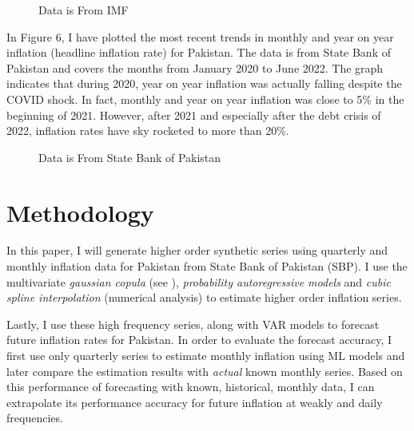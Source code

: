 \documentclass[12pt]{article}
\newcommand{\1}{\mathbbm 1}
\begin{document}
		
		\begin{figure}[H]
			\centering
			\scalebox{0.6}{}
			\hfill
			\caption{Data is From IMF}
		\end{figure}
		
		In Figure 6, I have plotted the most recent trends in monthly and year on year inflation (headline inflation rate)  for Pakistan. The data is from State Bank of Pakistan and covers the months from January 2020 to June 2022. The graph indicates that during 2020, year on year inflation was actually falling despite the COVID shock. In fact, monthly and year on year inflation was close to 5\% in the beginning of 2021. However, after 2021 and especially after the debt crisis of 2022, inflation rates have sky rocketed to more than 20\%. 
		
		\begin{figure}[H]
			\centering
			\scalebox{0.8}{}
			\hfill
			\caption{Data is From State Bank of Pakistan}
		\end{figure}
		
		\section{Methodology}
		
		
		
		
		In this paper, I will generate higher order synthetic series using quarterly and monthly inflation data for Pakistan from State Bank of Pakistan (SBP). I use the multivariate \textit{gaussian copula} (see \cite{patki2016synthetic}), \textit{probability autoregressive models} and \textit{cubic spline interpolation} (numerical analysis) to estimate higher order inflation series.
		
		Lastly, I use these high frequency series, along with VAR models to forecast future inflation rates for Pakistan. In order to evaluate the forecast accuracy, I first use only quarterly series to estimate monthly inflation using ML models and later compare the estimation results with \textit{actual} known monthly series. Based on this performance of forecasting with known, historical, monthly data, I can extrapolate its performance accuracy for future inflation at weakly and daily frequencies.
		
		
		
		
\end{document}
